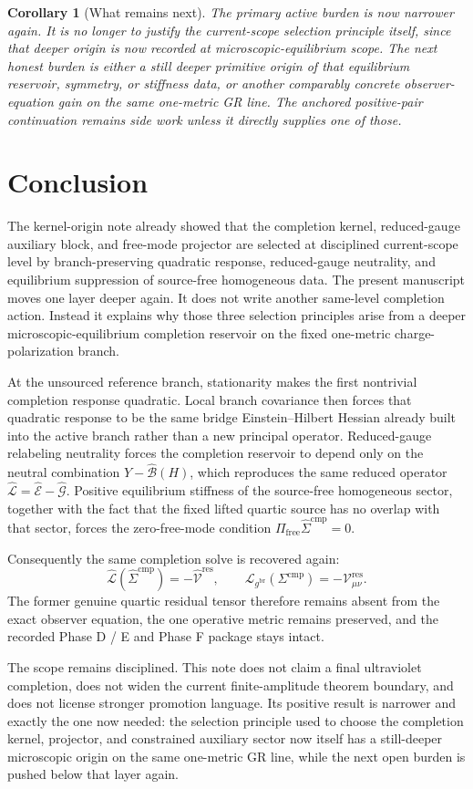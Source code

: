 \documentclass[11pt]{article}
\newcommand{\ObserverMetric}{g^{\mathrm{br}}}
\newcommand{\CompShift}{\Sigma^{\mathrm{cmp}}}
\newcommand{\CompLift}{\widehat\Sigma^{\mathrm{cmp}}}
\newcommand{\ResidualCore}{\mathcal V_{\mu\nu}^{\mathrm{res}}}
\newcommand{\ResidualLift}{\widehat{\mathcal V}^{\mathrm{res}}}
\newcommand{\SubEinLin}{\widehat{\mathcal E}}
\newcommand{\SubGaugeVec}{\widehat{\mathcal B}}
\newcommand{\SubGaugeBook}{\widehat{\mathcal G}}
\newcommand{\SubReducedEin}{\widehat{\mathcal L}}
\newcommand{\FreeProj}{\Pi_{\mathrm{free}}}
\newcommand{\GaugeAux}{Y}
\newcommand{\ReducedEin}{\mathcal L_{\ObserverMetric}}
\newtheorem{corollary}{Corollary}
\begin{document}
\begin{corollary}[What remains next]
The primary active burden is now narrower again. It is no longer to justify the current-scope selection principle itself, since that deeper origin is now recorded at microscopic-equilibrium scope. The next honest burden is either a still deeper primitive origin of that equilibrium reservoir, symmetry, or stiffness data, or another comparably concrete observer-equation gain on the same one-metric GR line. The anchored positive-pair continuation remains side work unless it directly supplies one of those.
\end{corollary}

\section{Conclusion}

The kernel-origin note already showed that the completion kernel, reduced-gauge auxiliary block, and free-mode projector are selected at disciplined current-scope level by branch-preserving quadratic response, reduced-gauge neutrality, and equilibrium suppression of source-free homogeneous data. The present manuscript moves one layer deeper again. It does not write another same-level completion action. Instead it explains why those three selection principles arise from a deeper microscopic-equilibrium completion reservoir on the fixed one-metric charge-polarization branch.

At the unsourced reference branch, stationarity makes the first nontrivial completion response quadratic. Local branch covariance then forces that quadratic response to be the same bridge Einstein--Hilbert Hessian already built into the active branch rather than a new principal operator. Reduced-gauge relabeling neutrality forces the completion reservoir to depend only on the neutral combination \(\GaugeAux-\SubGaugeVec(H)\), which reproduces the same reduced operator \(\SubReducedEin=\SubEinLin-\SubGaugeBook\). Positive equilibrium stiffness of the source-free homogeneous sector, together with the fact that the fixed lifted quartic source has no overlap with that sector, forces the zero-free-mode condition \(\FreeProj\CompLift=0\).

Consequently the same completion solve is recovered again:
\[
\SubReducedEin(\CompLift)=-\ResidualLift,
\qquad
\ReducedEin(\CompShift)=-\ResidualCore.
\]
The former genuine quartic residual tensor therefore remains absent from the exact observer equation, the one operative metric remains preserved, and the recorded Phase D / E and Phase F package stays intact.

The scope remains disciplined. This note does not claim a final ultraviolet completion, does not widen the current finite-amplitude theorem boundary, and does not license stronger promotion language. Its positive result is narrower and exactly the one now needed: the selection principle used to choose the completion kernel, projector, and constrained auxiliary sector now itself has a still-deeper microscopic origin on the same one-metric GR line, while the next open burden is pushed below that layer again.
\end{document}
